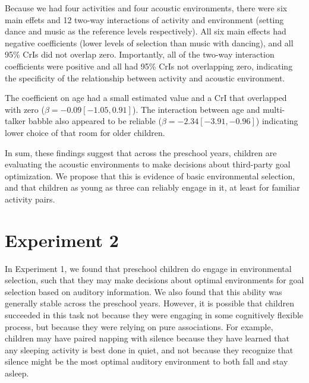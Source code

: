 \documentclass[10pt, letterpaper]{article}
\begin{document}
Because we had four activities and four acoustic environments, there
were six main effets and 12 two-way interactions of activity and
environment (setting dance and music as the reference levels
respectively). All six main effects had negative coefficients (lower
levels of selection than music with dancing), and all 95\% CrIs did not
overlap zero. Importantly, all of the two-way interaction coefficients
were positive and all had 95\% CrIs not overlapping zero, indicating the
specificity of the relationship between activity and acoustic
environment.

The coefficient on age had a small estimated value and a CrI that
overlapped with zero (\(\beta = -0.09 [-1.05, 0.91]\)). The interaction
between age and multi-talker babble also appeared to be reliable
(\(\beta = -2.34 [-3.91,-0.96]\)) indicating lower choice of that room
for older children.

In sum, these findings suggest that across the preschool years, children
are evaluating the acoustic environments to make decisions about
third-party goal optimization. We propose that this is evidence of basic
environmental selection, and that children as young as three can
reliably engage in it, at least for familiar activity pairs.

\hypertarget{experiment-2}{%
\section{Experiment 2}\label{experiment-2}}

In Experiment 1, we found that preschool children do engage in
environmental selection, such that they may make decisions about optimal
environments for goal selection based on auditory information. We also
found that this ability was generally stable across the preschool years.
However, it is possible that children succeeded in this task not because
they were engaging in some cognitively flexible process, but because
they were relying on pure associations. For example, children may have
paired napping with silence because they have learned that any sleeping
activity is best done in quiet, and not because they recognize that
silence might be the most optimal auditory environment to both fall and
stay asleep.
\end{document}
